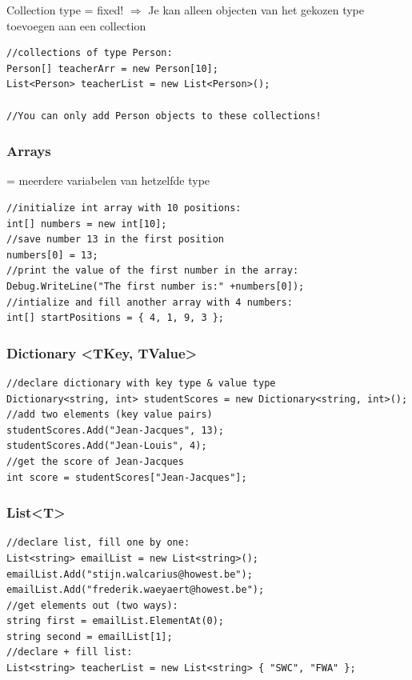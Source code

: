 \documentclass{article}
\begin{document}
Collection type = fixed! $\Rightarrow$ Je kan alleen objecten van het gekozen type toevoegen aan een collection

\begin{verbatim}
//collections of type Person:
Person[] teacherArr = new Person[10];
List<Person> teacherList = new List<Person>();

//You can only add Person objects to these collections!
\end{verbatim}


\subsubsection{Arrays}
= meerdere variabelen van hetzelfde type

\begin{verbatim}
//initialize int array with 10 positions:
int[] numbers = new int[10];
//save number 13 in the first position
numbers[0] = 13;
//print the value of the first number in the array:
Debug.WriteLine("The first number is:" +numbers[0]);
//intialize and fill another array with 4 numbers:
int[] startPositions = { 4, 1, 9, 3 };
\end{verbatim}

\subsubsection{Dictionary <TKey, TValue>}

\begin{verbatim}
//declare dictionary with key type & value type
Dictionary<string, int> studentScores = new Dictionary<string, int>();
//add two elements (key value pairs)
studentScores.Add("Jean-Jacques", 13);
studentScores.Add("Jean-Louis", 4);
//get the score of Jean-Jacques
int score = studentScores["Jean-Jacques"];
\end{verbatim}


\subsubsection{List<T>}

\begin{verbatim}
//declare list, fill one by one:
List<string> emailList = new List<string>();
emailList.Add("stijn.walcarius@howest.be");
emailList.Add("frederik.waeyaert@howest.be");
//get elements out (two ways):
string first = emailList.ElementAt(0);
string second = emailList[1];
//declare + fill list:
List<string> teacherList = new List<string> { "SWC", "FWA" };
\end{verbatim}
\end{document}
